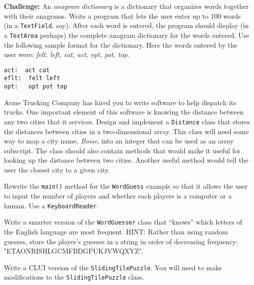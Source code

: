 \begin{EXRtwo}
\item  {\bf Challenge:} An {\it anagram dictionary} is a dictionary that
organizes words together with their anagrams.  Write a program that lets
the user enter up to 100 words (in a {\tt TextField}, say). After
each word is entered, the program should display (in a {\tt TextArea}
perhaps) the complete anagram dictionary for the words entered.
Use the following sample format for the dictionary.  Here the words
entered by the user were:  {\it felt, left, cat, act, opt, pot, top.}

\begin{jjjlisting}
\begin{lstlisting}
act:  act cat
eflt:  felt left
opt:   opt pot top
\end{lstlisting}
\end{jjjlisting}

\item  Acme Trucking Company has hired you
to write software to help dispatch its trucks.  One important element
of this software is knowing the distance between any two cities that
it services.   Design and implement a {\tt Distance} class that stores
the distances between cities in a two-dimensional array.   This class
will need some way to map a city name, {\it Boise}, into an integer that
can be used as an array subscript.  The class should also contain
methods that would make it useful for looking up the distance between
two cities.  Another useful method would tell the user the closest city
to a given city.

\item Rewrite the {\tt main()} method for the {\tt WordGuess} example so
that it allows the user to input the number of players and whether each 
players is a computer or a human. Use a {\tt KeyboardReader}.

\item Write a smarter version of the {\tt WordGuesser} class that
``knows'' which letters of the English language are most
frequent. HINT: Rather than using random guesses, store the player's
guesses in a string in order of decreasing frequency:
"ETAONRISHLGCMFBDGPUKJVWQXYZ".

\item Write a CLUI version of the {\tt SlidingTilePuzzle}. You will
need to make modifications to the {\tt SlidingTilePuzzle} class. 


\end{EXRtwo}
%
